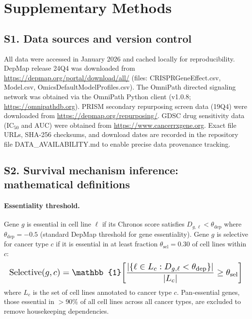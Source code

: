 \documentclass[11pt]{article}
\begin{document}

\section{Supplementary Methods}

\subsection{S1. Data sources and version control}
All data were accessed in January 2026 and cached locally for reproducibility. DepMap release 24Q4 was downloaded from \url{https://depmap.org/portal/download/all/} (files: CRISPRGeneEffect.csv, Model.csv, OmicsDefaultModelProfiles.csv). The OmniPath directed signaling network was obtained via the OmniPath Python client (v1.0.8; \url{https://omnipathdb.org}). PRISM secondary repurposing screen data (19Q4) were downloaded from \url{https://depmap.org/repurposing/}. GDSC drug sensitivity data (IC$_{50}$ and AUC) were obtained from \url{https://www.cancerrxgene.org}. Exact file URLs, SHA-256 checksums, and download dates are recorded in the repository file DATA\_AVAILABILITY.md to enable precise data provenance tracking.

\subsection{S2. Survival mechanism inference: mathematical definitions}

\paragraph{Essentiality threshold.} Gene $g$ is essential in cell line $\ell$ if its Chronos score satisfies $D_{g,\ell} < \theta_{\text{dep}}$ where $\theta_{\text{dep}} = -0.5$ (standard DepMap threshold for gene essentiality). Gene $g$ is selective for cancer type $c$ if it is essential in at least fraction $\theta_{\text{sel}} = 0.30$ of cell lines within $c$:
\[
\resizebox{\columnwidth}{!}{$\displaystyle
\text{Selective}(g, c) = \mathbb{1}\!\left[\frac{|\{\ell \in L_c : D_{g,\ell} < \theta_{\text{dep}}\}|}{|L_c|} \geq \theta_{\text{sel}}\right]
$}
\]
where $L_c$ is the set of cell lines annotated to cancer type $c$. Pan-essential genes, those essential in $>$90\% of all cell lines across all cancer types, are excluded to remove housekeeping dependencies.
\end{document}
